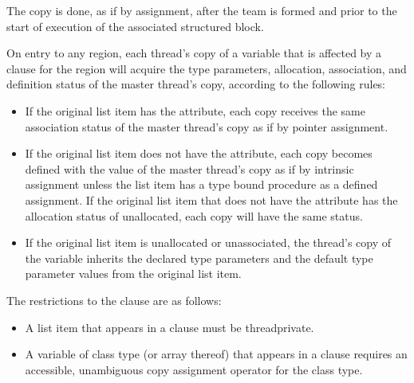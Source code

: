 \begin{fortranspecific}
The copy is done, as if by assignment, after the team is formed and prior to the start of
execution of the associated structured block.

On entry to any  region, each thread's copy of a variable that is affected by
a  clause for the  region will acquire the
type parameters, allocation, association, and
definition status of the master thread's copy, according to the following rules:

\begin{itemize}
\item If the original list item has the  attribute, each copy receives the same
association status of the master thread's copy as if by pointer assignment.

\item If the original list item does not have the 
attribute, each copy becomes defined with the value of the master
thread's copy as if by intrinsic assignment unless the list item has
a type bound procedure as a defined assignment.  If the original
list item that does not have the  attribute has the
allocation status of unallocated, each copy will have the same
status.

\item If the original list item is unallocated or unassociated, the
thread’s copy of the variable inherits the declared type parameters
and the default type parameter values from the original list item.
\end{itemize}
\end{fortranspecific}

\restrictions
The restrictions to the  clause are as follows:
\begin{ccppspecific}
\begin{itemize}
\item A list item that appears in a  clause must be threadprivate.

\item A variable of class type (or array thereof) that appears in a  clause requires
an accessible, unambiguous copy assignment operator for the class type.
\end{itemize}
\end{ccppspecific}

